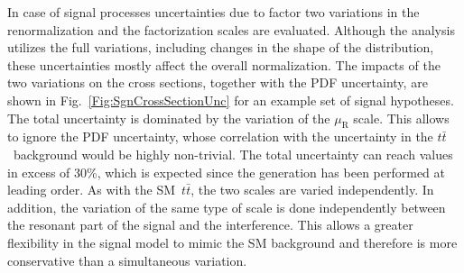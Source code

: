 \begin{table}
\end{table}


In case of signal processes uncertainties due to factor two variations in the renormalization and the factorization scales are evaluated.
Although the analysis utilizes the full variations, including changes in the shape of the distribution, these uncertainties mostly affect the overall normalization.
The impacts of the two variations on the cross sections, together with the PDF uncertainty, are shown in Fig.~\ref{Fig:SgnCrossSectionUnc} for an example set of signal hypotheses.
The total uncertainty is dominated by the variation of the $\mu_\text{R}$ scale.
This allows to ignore the PDF uncertainty, whose correlation with the uncertainty in the $t\bar t$~background would be highly non-trivial.
The total uncertainty can reach values in excess of 30\%, which is expected since the generation has been performed at leading order.
As with the SM~$t\bar t$, the two scales are varied independently.
In addition, the variation of the same type of scale is done independently between the resonant part of the signal and the interference.
This allows a greater flexibility in the signal model to mimic the SM background and therefore is more conservative than a simultaneous variation.


